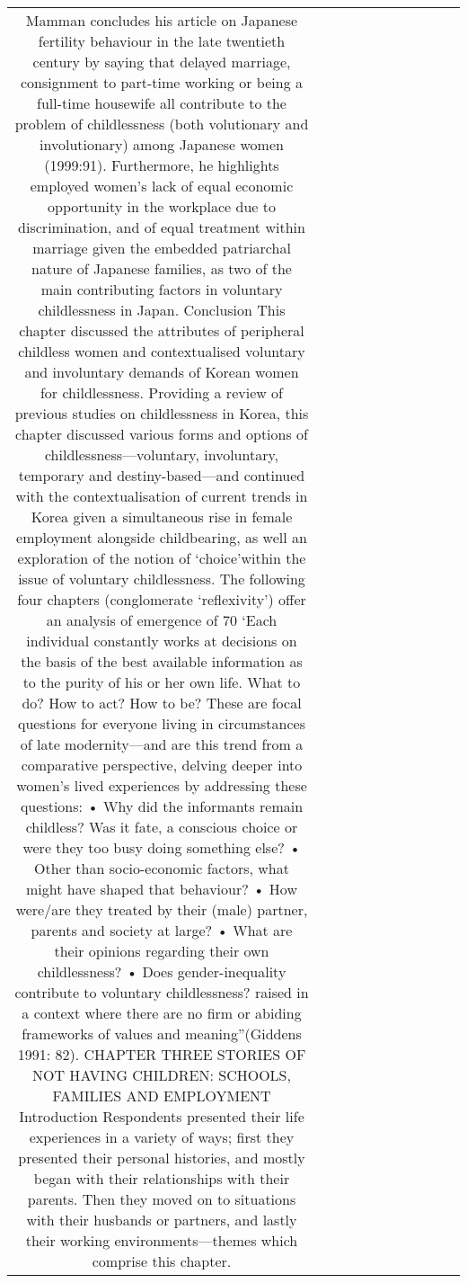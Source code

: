 \begin{table}[h!]
\begin{tabular}{|c|c|c|c|c|c|c|c|c|c|c|}
Mamman concludes his article on Japanese fertility behaviour in the late twentieth century by saying that delayed marriage, consignment to part-time working or being a full-time housewife all contribute to the problem of childlessness (both volutionary and involutionary) among Japanese women (1999:91). Furthermore, he highlights employed women’s lack of equal economic opportunity in the workplace due to discrimination, and of equal treatment within marriage given the embedded patriarchal nature of Japanese families, as two of the main contributing factors in voluntary childlessness in Japan.
Conclusion
This chapter discussed the attributes of peripheral childless women and contextualised voluntary and involuntary demands of Korean women for childlessness. Providing a review of previous studies on childlessness in Korea, this chapter discussed various forms and options of childlessness—voluntary, involuntary, temporary and destiny-based—and continued with the contextualisation of current trends in Korea given a simultaneous rise in female employment alongside childbearing, as well an exploration of the notion of ‘choice’within the issue of voluntary childlessness.
The following four chapters (conglomerate ‘reflexivity’) offer an analysis of emergence of
70 ‘Each individual constantly works at decisions on the basis of the best available information as to the purity of his or her own life. What to do? How to act? How to be? These are focal questions for everyone living in circumstances of late modernity—and are
this trend from a comparative perspective, delving deeper into women’s lived experiences by addressing these questions:
• Why did the informants remain childless? Was it fate, a conscious choice or were they too busy doing something else? • Other than socio-economic factors, what might have shaped that behaviour? • How were/are they treated by their (male) partner, parents and society at large? • What are their opinions regarding their own childlessness? • Does gender-inequality contribute to voluntary childlessness? raised in a context where there are no firm or abiding frameworks of values and meaning”(Giddens 1991: 82).
CHAPTER THREE
STORIES OF NOT HAVING CHILDREN: SCHOOLS, FAMILIES AND
EMPLOYMENT
Introduction
Respondents presented their life experiences in a variety of ways; first they presented their personal histories, and mostly began with their relationships with their parents.
Then they moved on to situations with their husbands or partners, and lastly their working environments—themes which comprise this chapter.

\end{tabular}
\end{table}

